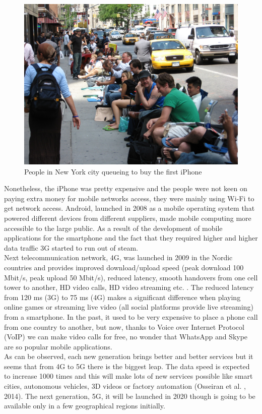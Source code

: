 \documentclass[11]{article}
\begin{document}
\begin{figure}[H]

	\includegraphics[scale = 0.6]{iphonesMania}
	\caption{People in New York city queueing to buy the first iPhone}
	\label{firstIphone}

\end{figure} 


Nonetheless, the iPhone was pretty expensive and the people were not keen on paying extra money for mobile networks access, they were mainly using Wi-Fi to get network access. Android, launched in 2008 as a mobile operating system that powered different devices from different suppliers, made mobile computing more accessible to the large public. As a result of the development of mobile applications for the smartphone and the fact that they required higher and higher data traffic 3G started to run out of steam.\\
	\indent
	Next telecommunication network, 4G, was launched in 2009 in the Nordic countries and provides improved download/upload speed (peak download 100 Mbit/s, peak upload 50 Mbit/s), reduced latency, smooth handovers from one cell tower to another, HD video calls, HD video streaming etc. . The reduced latency from 120 ms (3G) to 75 ms (4G) makes a significant difference when playing online games or streaming live video (all social platforms provide live streaming) from a smartphone. In the past, it used to be very expensive to place a phone call from one country to another, but now, thanks to Voice over Internet Protocol (VoIP) we can make video calls for free, no wonder that WhatsApp and Skype are so popular mobile applications.\\
	\indent
	As can be observed, each new generation brings better and better services but it seems that from 4G to 5G there is the biggest leap. The data speed is expected to increase 1000 times and this will make lots of new services possible like smart cities, autonomous vehicles, 3D videos or factory automation (Osseiran et al. , 2014). The next generation, 5G, it will be launched in 2020 though  
is going to be available only in a few geographical regions initially.
\end{document}
